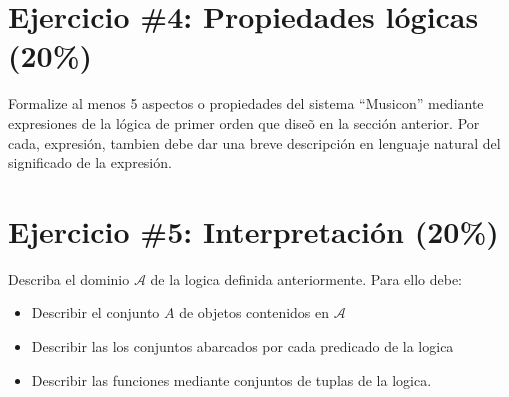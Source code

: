 \documentclass{article}
\begin{document}
\section*{Ejercicio \#4: Propiedades l\'ogicas (20\%)}
Formalize al menos 5 aspectos o propiedades del sistema ``Musicon'' mediante expresiones
de la l\'ogica de primer orden que dise\~o en la secci\'on anterior. Por cada,
expresi\'on, tambien debe dar una breve descripci\'on en lenguaje natural
del significado de la expresi\'on.

\section*{Ejercicio \#5: Interpretaci\'on (20\%)}
Describa el dominio $\mathcal{A}$ de la logica definida anteriormente. Para ello debe:
\begin{itemize}
        \item{Describir el conjunto $\mathit{A}$ de objetos contenidos en $\mathcal{A}$}
        \item{Describir las los conjuntos abarcados por cada predicado de la logica}
        \item{Describir las funciones mediante conjuntos de tuplas de la logica.}
\end{itemize}



\end{document}
